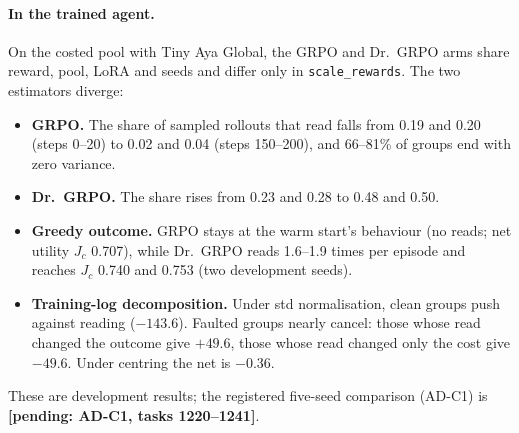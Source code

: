 \documentclass[11pt]{article}
\newcommand{\pend}[1]{\textbf{[pending: #1]}}
\begin{document}
\paragraph{In the trained agent.} On the costed pool with Tiny Aya Global, the GRPO and Dr.~GRPO arms share reward,
pool, LoRA and seeds and differ only in \texttt{scale\_rewards}. The two estimators diverge:
\begin{itemize}
\item \textbf{GRPO.} The share of sampled rollouts that read falls from 0.19 and 0.20 (steps 0--20) to 0.02 and 0.04
(steps 150--200), and 66--81\% of groups end with zero variance.
\item \textbf{Dr.~GRPO.} The share rises from 0.23 and 0.28 to 0.48 and 0.50.
\item \textbf{Greedy outcome.} GRPO stays at the warm start's behaviour (no reads; net utility $J_c$ 0.707), while
Dr.~GRPO reads 1.6--1.9 times per episode and reaches $J_c$ 0.740 and 0.753 (two development seeds).
\item \textbf{Training-log decomposition.} Under std normalisation, clean groups push against reading ($-143.6$).
Faulted groups nearly cancel: those whose read changed the outcome give $+49.6$, those whose read changed only the
cost give $-49.6$. Under centring the net is $-0.36$.
\end{itemize}
These are development results; the registered five-seed comparison (AD-C1) is \pend{AD-C1, tasks 1220--1241}.
\end{document}
